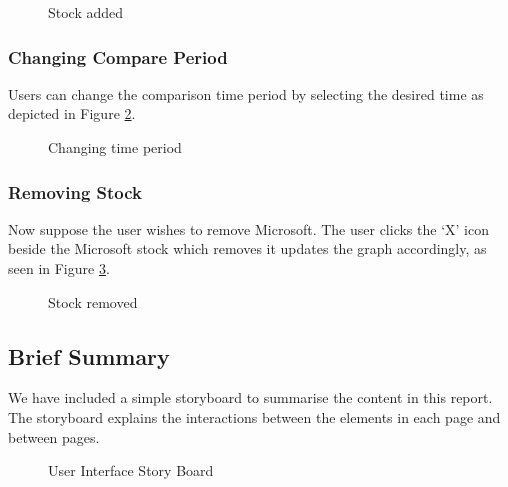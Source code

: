 \documentclass[11pt]{article}
\numberwithin{figure}{section}
\begin{document}
            \begin{figure}[htp]
                \centering
                \caption{Stock added}
                \label{fig:compareAddWire}
            \end{figure}
            
        \subsubsection{Changing Compare Period}
            Users can change the comparison time period by selecting the desired time as depicted in Figure \ref{fig:compareTimeWire}.
            
            \clearpage
            \begin{figure}[htp]
                \centering
                \caption{Changing time period}
                \label{fig:compareTimeWire}
            \end{figure}
        
        \subsubsection{Removing Stock}
            Now suppose the user wishes to remove Microsoft. The user clicks the ‘X’ icon beside the Microsoft stock which removes it updates the graph accordingly, as seen in Figure \ref{fig:compareRemoveWire}.
            \clearpage
            
            \begin{figure}[htp]
                \centering
                \caption{Stock removed}
                \label{fig:compareRemoveWire}
            \end{figure}
            
    \subsection{Brief Summary}
        We have included a simple storyboard to summarise the content in this report. The storyboard explains the interactions between the elements in each page and between pages.
        
        \clearpage        
        \begin{figure}[htp]
            \centering
            \caption{User Interface Story Board}
            \label{}
        \end{figure}
\end{document}
